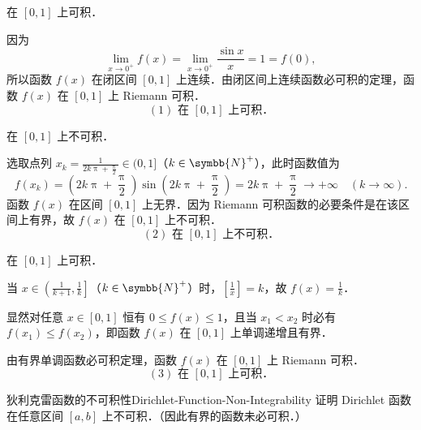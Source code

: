 \begin{solution}
     在 $[0, 1]$ 上可积．

    因为
    \begin{equation}
        \lim_{x\to 0^+} f(x) = \lim_{x\to 0^+} \frac{\sin x}{x} = 1 = f(0),
    \end{equation}
    所以函数 $f(x)$ 在闭区间 $[0, 1]$ 上连续．由闭区间上连续函数必可积的定理，函数 $f(x)$ 在 $[0, 1]$ 上 Riemann 可积．
    \begin{equation}
        \boxed{(1) \text{ 在 } [0, 1] \text{ 上可积．}}
    \end{equation}

     在 $[0, 1]$ 上不可积．

    选取点列 $x_k = \frac{1}{2k\uppi + \frac{\uppi}{2}} \in (0, 1]$（$k \in \symbb{N}^+$），此时函数值为
    \begin{equation}
        f(x_k) = \left( 2k\uppi + \frac{\uppi}{2} \right) \sin\left( 2k\uppi + \frac{\uppi}{2} \right) = 2k\uppi + \frac{\uppi}{2} \to +\infty \quad (k \to \infty).
    \end{equation}
    函数 $f(x)$ 在区间 $[0, 1]$ 上无界．因为 Riemann 可积函数的必要条件是在该区间上有界，故 $f(x)$ 在 $[0, 1]$ 上不可积．
    \begin{equation}
        \boxed{(2) \text{ 在 } [0, 1] \text{ 上不可积．}}
    \end{equation}

     在 $[0, 1]$ 上可积．

    当 $x \in \left( \frac{1}{k+1}, \frac{1}{k} \right]$（$k \in \symbb{N}^+$）时，$\left[\frac{1}{x}\right] = k$，故 $f(x) = \frac{1}{k}$．

    显然对任意 $x \in [0, 1]$ 恒有 $0 \leqslant f(x) \leqslant 1$，且当 $x_1 < x_2$ 时必有 $f(x_1) \leqslant f(x_2)$，即函数 $f(x)$ 在 $[0, 1]$ 上单调递增且有界．

    由有界单调函数必可积定理，函数 $f(x)$ 在 $[0, 1]$ 上 Riemann 可积．
    \begin{equation}
        \boxed{(3) \text{ 在 } [0, 1] \text{ 上可积．}}
    \end{equation}
\end{solution}

\begin{problem}{狄利克雷函数的不可积性}{Dirichlet-Function-Non-Integrability}
    证明 Dirichlet 函数在任意区间 $[a, b]$ 上不可积．（因此有界的函数未必可积．）
\end{problem}

